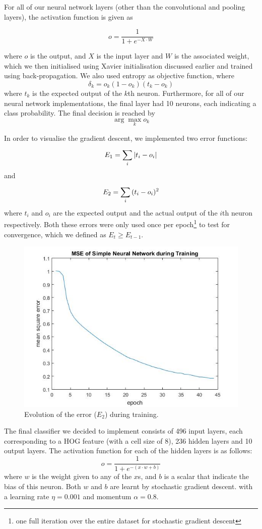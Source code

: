\documentclass{article} %
\begin{document}
For all of our neural network layers (other than the convolutional and pooling layers), the activation function is given as

$$o = \frac{1}{1+e^{-X\cdot W}}$$

where $o$ is the output, and $X$ is the input layer and $W$ is the associated weight, which we then initialised using Xavier initialisation discussed earlier and trained using back-propagation.
We also used entropy as objective function, where
$$\delta_k = o_k(1-o_k)(t_k-o_k)$$
where $t_k$ is the expected output of the $k$th neuron. Furthermore, for all of our neural network implementations, the final layer had 10 neurons, each indicating a class probability. The final decision is reached by 
$$\arg\max_k o_k$$

In order to visualise the gradient descent, we implemented two error functions:
  $$E_1 = \sum^{}_{i}{|t_i-o_i|}$$
and
  $$E_2 = \sum^{}_{i}{(t_i-o_i)^2}$$
where $t_i$ and $o_i$ are the expected output and the actual output of the $i$th neuron respectively. Both these errors were only used once per epoch\footnote{one full iteration over the entire dataset for stochastic gradient descent} to test for convergence, which we defined as $E_{t}\geq E_{t-1}$.

\begin{figure}
\centering
\includegraphics[scale=0.55]{MSENN.jpg}
\caption{Evolution of the error ($E_2$) during training. }
\end{figure}


The final classifier we decided to implement consists of 496 input layers, each corresponding to a HOG feature (with a cell size of 8), 236 hidden layers and 10 output layers. The activation function for each of the hidden layers is as follows:
  $$o = \frac{1}{1+e^{-(x\cdot w+b)}}$$
where $w$ is the weight given to any of the $x$s, and $b$ is a scalar that indicate the bias of this neuron. Both $w$ and $b$ are learnt by stochastic gradient descent. with a learning rate $\eta=0.001$ and momentum $\alpha=0.8$.
\end{document}
